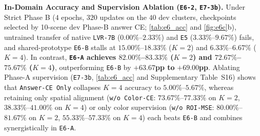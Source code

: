 \textbf{In-Domain Accuracy and Supervision Ablation (\texttt{E6-2}, \texttt{E7-3b}).} Under Strict Phase B ($4$ epochs, $320$ updates on the $40$ dev clusters, checkpoints selected by 10-scene dev Phase-B answer CE; \cref{tab:e6_acc} and \cref{fig:e6c}b), untrained transfer of native \texttt{LVR-7B} ($0.00\%$--$2.33\%$) and \texttt{E5} ($3.33\%$--$9.67\%$) fails, and shared-prototype \texttt{E6-B} stalls at $15.00\%$--$18.33\%$ ($K=2$) and $6.33\%$--$6.67\%$ ($K=4$). In contrast, \textbf{\texttt{E6-A} achieves $82.00\%$--$83.33\%$ ($K=2$) and $72.67\%$--$75.67\%$ ($K=4$)}, outperforming \texttt{E6-B} by $\mathbf{+63.67}$\textbf{pp to }$\mathbf{+69.00}$\textbf{pp}. Ablating Phase-A supervision (\texttt{E7-3b}, \cref{tab:e6_acc} and Supplementary Table~S16) shows that \texttt{Answer-CE Only} collapses $K=4$ accuracy to $5.00\%$--$5.67\%$, whereas retaining only spatial alignment (\texttt{w/o Color-CE}: $73.67\%$--$77.33\%$ on $K=2$, $38.33\%$--$41.00\%$ on $K=4$) or only color supervision (\texttt{w/o ROI-MSE}: $80.00\%$--$81.67\%$ on $K=2$, $55.33\%$--$57.33\%$ on $K=4$) each beats \texttt{E6-B} and combines synergistically in \texttt{E6-A}.

